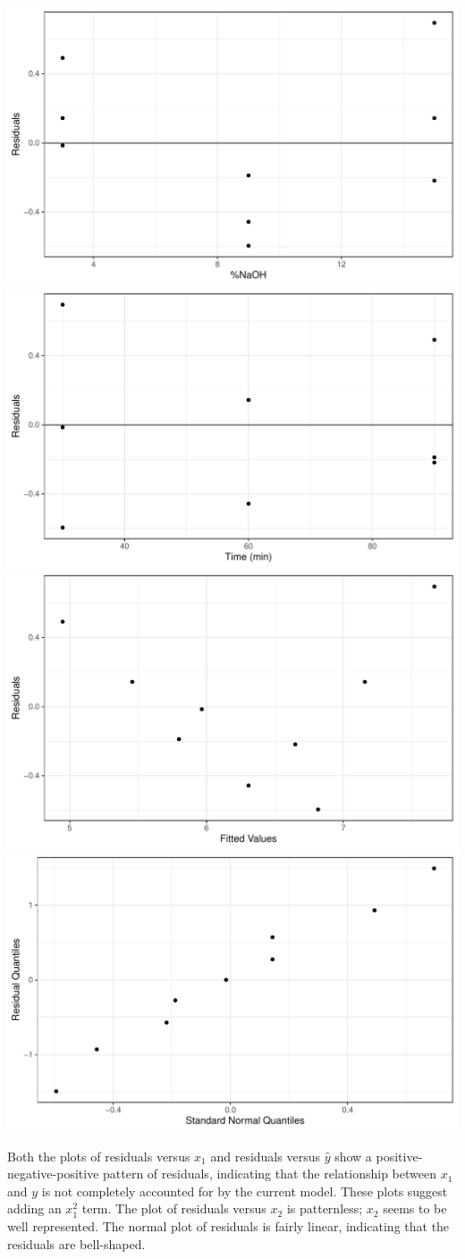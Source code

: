 \documentclass{article}\usepackage[]{graphicx}\usepackage[]{color}
\newenvironment{knitrout}{}{} %
\begin{document}
\begin{enumerate}
\begin{enumerate}
\begin{knitrout}
{\centering \includegraphics[width=.49\linewidth]{figure/fig-sub-1} 
\includegraphics[width=.49\linewidth]{figure/fig-sub-2} 
\includegraphics[width=.49\linewidth]{figure/fig-sub-3} 
\includegraphics[width=.49\linewidth]{figure/fig-sub-4} 

}



\end{knitrout}
  
  Both the plots of residuals versus $x_1$ and residuals versus $\hat{y}$ show a positive-negative-positive pattern of residuals, indicating that the relationship between $x_1$ and $y$ is not completely accounted for by the current model. These plots suggest adding an $x_1^2$ term. The plot of residuals versus $x_2$ is patternless; $x_2$ seems to be well represented. The normal plot of residuals is fairly linear, indicating that the residuals are bell-shaped.
  

\end{enumerate}
\end{enumerate}
\end{document}
